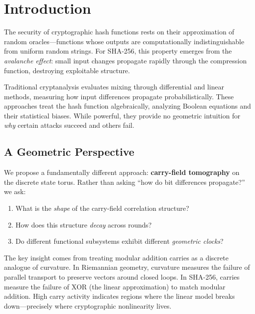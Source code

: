 \documentclass[11pt,a4paper]{article}
\theoremstyle{plain}
\theoremstyle{definition}
\theoremstyle{remark}
\begin{document}
\tableofcontents
\newpage

\section{Introduction}

The security of cryptographic hash functions rests on their approximation of random oracles---functions whose outputs are computationally indistinguishable from uniform random strings. For SHA-256, this property emerges from the \emph{avalanche effect}: small input changes propagate rapidly through the compression function, destroying exploitable structure.

Traditional cryptanalysis evaluates mixing through differential and linear methods, measuring how input differences propagate probabilistically. These approaches treat the hash function algebraically, analyzing Boolean equations and their statistical biases. While powerful, they provide no geometric intuition for \emph{why} certain attacks succeed and others fail.

\subsection{A Geometric Perspective}

We propose a fundamentally different approach: \textbf{carry-field tomography} on the discrete state torus. Rather than asking ``how do bit differences propagate?'' we ask:
\begin{enumerate}
    \item What is the \emph{shape} of the carry-field correlation structure?
    \item How does this structure \emph{decay} across rounds?
    \item Do different functional subsystems exhibit different \emph{geometric clocks}?
\end{enumerate}

The key insight comes from treating modular addition carries as a discrete analogue of curvature. In Riemannian geometry, curvature measures the failure of parallel transport to preserve vectors around closed loops. In SHA-256, carries measure the failure of XOR (the linear approximation) to match modular addition. High carry activity indicates regions where the linear model breaks down---precisely where cryptographic nonlinearity lives.
\end{document}
